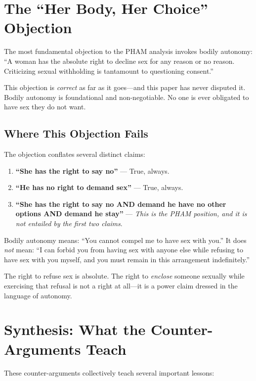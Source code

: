 \documentclass[12pt,openany]{book}
\numberwithin{equation}{chapter}
\begin{document}
\section{The ``Her Body, Her Choice'' Objection}

The most fundamental objection to the PHAM analysis invokes bodily autonomy: ``A woman has the absolute right to decline sex for any reason or no reason. Criticizing sexual withholding is tantamount to questioning consent.''

This objection is \textit{correct} as far as it goes---and this paper has never disputed it. Bodily autonomy is foundational and non-negotiable. No one is ever obligated to have sex they do not want.

\subsection{Where This Objection Fails}

The objection conflates several distinct claims:

\begin{enumerate}
    \item \textbf{``She has the right to say no''} --- True, always.
    
    \item \textbf{``He has no right to demand sex''} --- True, always.
    
    \item \textbf{``She has the right to say no AND demand he have no other options AND demand he stay''} --- \textit{This is the PHAM position, and it is not entailed by the first two claims}.
\end{enumerate}

Bodily autonomy means: ``You cannot compel me to have sex with you.'' It does \textit{not} mean: ``I can forbid you from having sex with anyone else while refusing to have sex with you myself, and you must remain in this arrangement indefinitely.''

The right to refuse sex is absolute. The right to \textit{enclose} someone sexually while exercising that refusal is not a right at all---it is a power claim dressed in the language of autonomy.

\section{Synthesis: What the Counter-Arguments Teach}

These counter-arguments collectively teach several important lessons:
\end{document}
